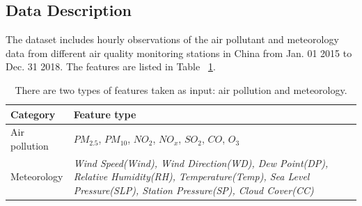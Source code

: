 \subsection{Data Description}
\label{section:datadescription}

The dataset includes hourly observations of the air pollutant and meteorology data from different air quality monitoring stations in China from Jan. 01 2015 to Dec. 31 2018.
The features are listed in Table ~\ref{table:feature_list}.

\begin{table}[h!]
\centering
\caption{There are two types of features taken as input: air pollution and meteorology. }
\begin{tabular}{|p{2cm}|p{5.2cm}|} 
\hline
 Category & Feature type \\ [0.5ex] 
\hline
    Air pollution&$PM_{2.5}$, $PM_{10}$, $NO_{2}$, $NO_{x}$, $SO_{2}$, $CO$, $O_3$\\[0.4ex] 
\hline
    Meteorology&\textit{Wind Speed(Wind), Wind Direction(WD), Dew Point(DP), Relative Humidity(RH), Temperature(Temp), Sea Level Pressure(SLP), Station Pressure(SP), Cloud Cover(CC)}\\
\hline
\end{tabular}
\label{table:feature_list}
\end{table}

